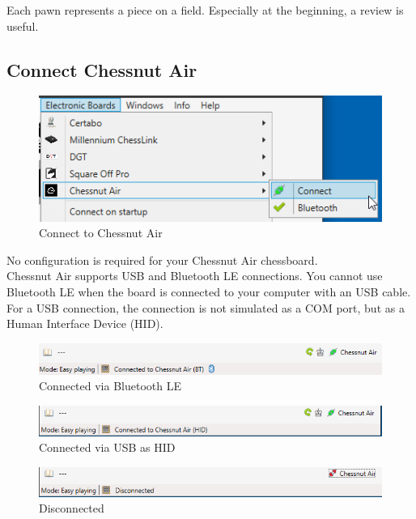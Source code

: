 \documentclass[11pt,a4paper]{article}
\begin{document}
Each pawn represents a piece on a field. Especially at the beginning, a review is useful. 

\subsection{Connect Chessnut Air} \label{ConnectChessnutAir}
\begin{figure}[H]
	\centering
	\includegraphics[scale=1.0]{ChessnutAir1.png}
	\caption{Connect to Chessnut Air }
	\label{fig:ChessnutAir1}
\end{figure}

No configuration is required for your Chessnut Air chessboard.\\
Chessnut Air supports USB and Bluetooth LE connections. You cannot use Bluetooth LE when the board is connected to your computer with an USB cable.\\
For a USB connection, the connection is not simulated as a COM port, but as a Human Interface Device (HID).

\begin{figure}[H]
	\centering
	\includegraphics[scale=0.7]{ChessnutAir2.png}
	\caption{Connected via Bluetooth LE}
	\label{fig:ChessnutAir2}
\end{figure}


\begin{figure}[H]
	\centering
	\includegraphics[scale=0.7]{ChessnutAir4.png}
	\caption{Connected via USB as HID}
	\label{fig:ChessnutAir4}
\end{figure}



\begin{figure}[H]
	\centering
	\includegraphics[scale=0.7]{ChessnutAir3.png}
	\caption{Disconnected}
	\label{fig:ChessnutAir3}
\end{figure}
\end{document}
